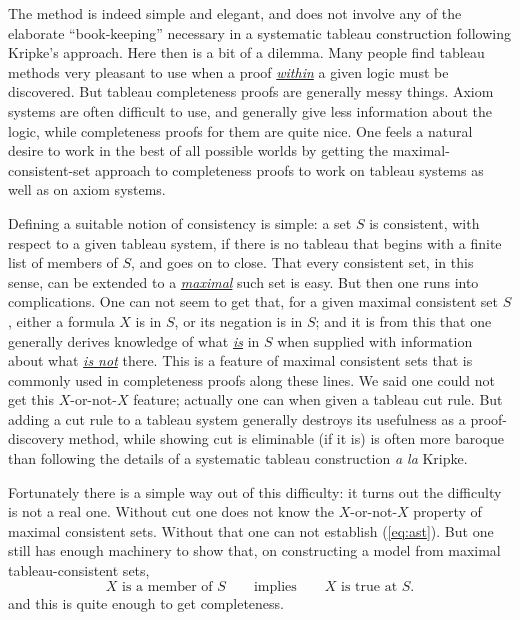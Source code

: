 The method is indeed simple and elegant, 
and does not involve any of the elaborate ``book-keeping'' necessary in a systematic tableau construction following Kripke's approach. 
% 
Here then is a bit of a dilemma. 
% 
Many people find tableau methods very pleasant to use when a proof \underline{\textit{within}} a given logic must be discovered.
% 
But tableau completeness proofs are generally messy things. 
% 
Axiom systems are often difficult to use, 
and generally give less information about the logic, 
while completeness proofs for them are quite nice. 
% 
One feels a natural desire to work in the best of all possible worlds by getting the maximal-consistent-set approach to completeness proofs to work on tableau systems as well as on axiom systems.




Defining a suitable notion of consistency is simple: 
a set $S$ is consistent, 
with respect to a given tableau system, 
if there is no tableau that begins with a finite list of members of $S$, 
and goes on to close. 
% 
That every consistent set, in this sense, can be extended to a \underline{\textit{maximal}}
such set is easy.
% 
But then one runs into complications.
% 
One can not seem to get that, 
for a given maximal consistent set $S$, 
either a formula $X$ is in $S$, 
or its negation is in $S$; 
and it is from this that one generally derives knowledge of what \underline{\textit{is}} in $S$ when supplied with information about what \underline{\textit{is not}} there.
% 
This is a feature of maximal consistent sets that is commonly used in
completeness proofs along these lines.
% 
We said one could not get this $X$-or-not-$X$ feature; 
actually one can when given a tableau cut rule. 
But adding a cut rule to a tableau system generally destroys its usefulness as a
proof-discovery method, 
while showing cut is eliminable 
(if it is) is often more baroque than following the details of
a systematic tableau construction \textit{a la} Kripke.


Fortunately there is a simple way out of this difficulty: 
it turns out the difficulty is not a real one.
% 
Without cut one does not know the $X$-or-not-$X$ property of maximal consistent sets.
% 
Without that one can not establish (\ref{eq:ast}).
% 
But one still has enough machinery to show that, 
on constructing a model from maximal tableau-consistent sets,
\[
    X \text{~is a member of~} S
    \qquad\text{implies}\qquad
    X \text{~is true at~} S.
    \tag{$\ast\ast$}
    \label{eq:ast-ast}
\]
and this is quite enough to get completeness.



